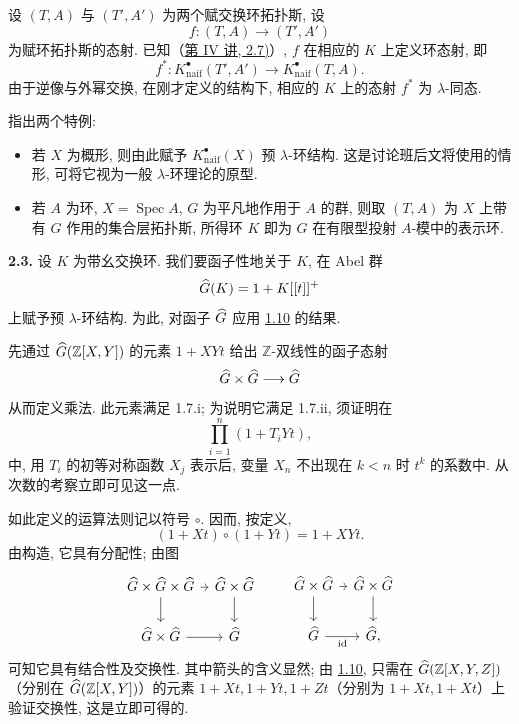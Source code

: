 设 \((T,A)\) 与 \((T',A')\) 为两个赋交换环拓扑斯, 设
\[
  f:(T,A)\longrightarrow (T',A')
\]
为赋环拓扑斯的态射. 已知（\hyperlink{sga6.e04.para.2-7}{第 IV 讲, 2.7)}）, \(f\) 在相应的 \(K\) 上定义环态射, 即
\[
  f^*:K^{\bullet}_{\mathrm{naif}}(T',A')\longrightarrow K^{\bullet}_{\mathrm{naif}}(T,A).
\]
由于逆像与外幂交换, 在刚才定义的结构下, 相应的 \(K\) 上的态射 \(f^*\) 为 \(\lambda\)-同态.

指出两个特例:
\begin{itemize}
\item 若 \(X\) 为概形, 则由此赋予 \(K^{\bullet}_{\mathrm{naif}}(X)\) 预 \(\lambda\)-环结构. 这是讨论班后文将使用的情形, 可将它视为一般 \(\lambda\)-环理论的原型.
\item 若 \(A\) 为环, \(X=\operatorname{Spec}A\), \(G\) 为平凡地作用于 \(A\) 的群, 则取 \((T,A)\) 为 \(X\) 上带有 \(G\) 作用的集合层拓扑斯, 所得环 \(K\) 即为 \(G\) 在有限型投射 \(A\)-模中的表示环.
\end{itemize}

\textbf{2.3.} 设 \(K\) 为带幺交换环. 我们要函子性地关于 \(K\), 在 Abel 群
\[
  \widehat G(K)=1+K[[t]]^+
\]
上赋予预 \(\lambda\)-环结构. 为此, 对函子 \(\widehat G\) 应用 \hyperlink{sga6.e05.thm.1-10}{1.10} 的结果.

先通过 \(\widehat G(\mathbb Z[X,Y])\) 的元素 \(1+XYt\) 给出 \(\mathbb Z\)-双线性的函子态射
\[
  \widehat G\times\widehat G\longrightarrow\widehat G
\]
从而定义乘法. 此元素满足 1.7.i; 为说明它满足 1.7.ii, 须证明在
\[
  \prod_{i=1}^{n}(1+T_iYt),
\]
中, 用 \(T_i\) 的初等对称函数 \(X_j\) 表示后, 变量 \(X_n\) 不出现在 \(k<n\) 时 \(t^k\) 的系数中. 从次数的考察立即可见这一点.

如此定义的运算法则记以符号 \(\circ\). 因而, 按定义,
\begin{equation}\tag{2.3.1}
  (1+Xt)\circ(1+Yt)=1+XYt .
\end{equation}
由构造, 它具有分配性; 由图
\[
\begin{tikzcd}[column sep=tiny]
\Ghat\times\Ghat\times\Ghat \arrow[r] \arrow[d] &
\Ghat\times\Ghat \arrow[d]\\
\Ghat\times\Ghat \arrow[r] & \Ghat
\end{tikzcd}
\qquad
\begin{tikzcd}[column sep=tiny]
\Ghat\times\Ghat \arrow[r] \arrow[d] &
\Ghat\times\Ghat \arrow[d]\\
\Ghat \arrow[r,"\id"'] & \Ghat,
\end{tikzcd}
\]
可知它具有结合性及交换性. 其中箭头的含义显然; 由 \hyperlink{sga6.e05.thm.1-10}{1.10}, 只需在 \(\widehat G(\mathbb Z[X,Y,Z])\)（分别在 \(\widehat G(\mathbb Z[X,Y])\)）的元素 \(1+Xt,1+Yt,1+Zt\)（分别为 \(1+Xt,1+Xt\)）上验证交换性, 这是立即可得的.

